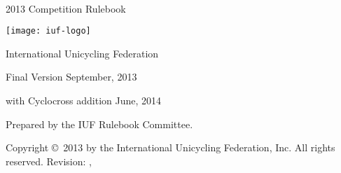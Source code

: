 




\begin{titlepage}
\centering
\ \\
\vspace{5cm}
{\Huge 2013 Competition Rulebook}
\vspace{5mm}

\texttt{[image: iuf-logo]}

\vspace{5mm}
{\huge International Unicycling Federation}

\vspace{5mm}
{\Large Final Version \quad September, 2013}

\vspace{3mm}
{\large with Cyclocross addition \quad June, 2014}

\vspace{45mm}
Prepared by the IUF Rulebook Committee.

\vspace{5mm}
{\small Copyright \copyright\ 2013 by the International Unicycling Federation, Inc. All rights reserved.}
\small{Revision: \gitHash, \gitCommitterDate}

\end{titlepage}

\doparttoc
\tableofcontents

\mainmatter











\backmatter


